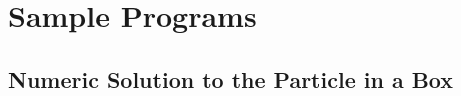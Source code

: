 \chapter{Sample Programs}

\section{Numeric Solution to the Particle in a Box}
\label{conf-el-prog}

